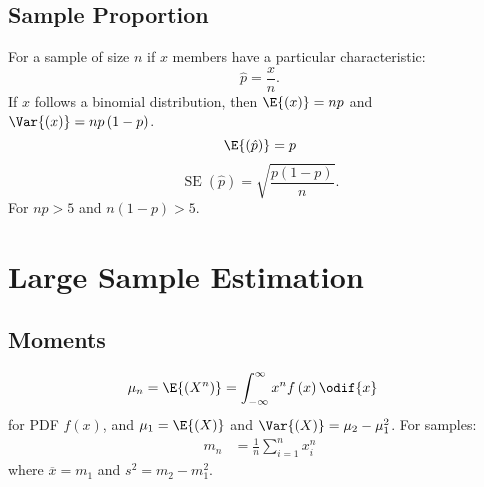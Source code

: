 \documentclass{article}
\begin{document}
\begin{multicols}{3}
    \subsection{Sample Proportion}
    For a sample of size \(n\) if \(x\) members have a particular characteristic:
    \begin{equation*}
        \hat{p} = \frac{x}{n}.
    \end{equation*}
    If \(x\) follows a binomial distribution, then \(\E{\left( x \right)} = np\) and \(\Var{\left( x \right)} = np\left( 1 - p \right)\).
    \begin{equation*}
        \E{\left( \hat{p} \right)} = p
    \end{equation*}
    \begin{equation*}
        \operatorname{SE}{\left( \hat{p} \right)} = \sqrt{\frac{p\left( 1 - p \right)}{n}}.
    \end{equation*}
    For \(np > 5\) and \(n\left( 1 - p \right) > 5\).
    \section{Large Sample Estimation}
    \subsection{Moments}
    \begin{align*}
        \mu_n & = \E{\left( X^n \right)} = \int_{-\infty}^\infty x^n f\left( x \right) \odif{x}
    \end{align*}
    for PDF \(f\left( x \right)\), and \(\mu_1 = \E{\left( X \right)}\) and \(\Var{\left( X \right)} = \mu_2 - \mu_1^2\).
    For samples:
    \begin{align*}
        m_n & = \frac{1}{n} \sum_{i = 1}^n x_i^n
    \end{align*}
    where \(\overline{x} = m_1\) and \(s^2 = m_2 - m_1^2\).

\end{multicols}
\end{document}

